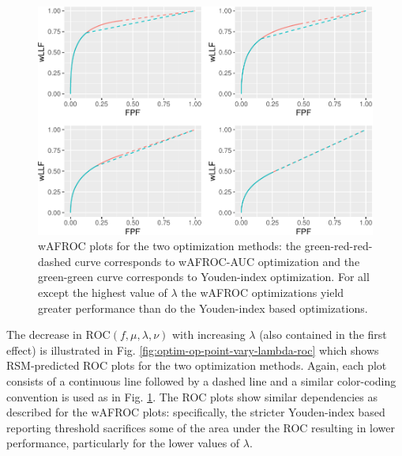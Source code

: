 \documentclass[
]{book}
\begin{document}
\begin{figure}
\centering
\includegraphics{21-optim-op-point_files/figure-latex/optim-op-point-vary-lambda-wafroc-1.pdf}
\caption{\label{fig:optim-op-point-vary-lambda-wafroc}wAFROC plots for the two optimization methods: the green-red-red-dashed curve corresponds to wAFROC-AUC optimization and the green-green curve corresponds to Youden-index optimization. For all except the highest value of \(\lambda\) the wAFROC optimizations yield greater performance than do the Youden-index based optimizations.}
\end{figure}

The decrease in \(\text{ROC} \left ( f, \mu, \lambda, \nu \right )\) with increasing \(\lambda\) (also contained in the first effect) is illustrated in Fig. \ref{fig:optim-op-point-vary-lambda-roc} which shows RSM-predicted ROC plots for the two optimization methods. Again, each plot consists of a continuous line followed by a dashed line and a similar color-coding convention is used as in Fig. \ref{fig:optim-op-point-vary-lambda-wafroc}. The ROC plots show similar dependencies as described for the wAFROC plots: specifically, the stricter Youden-index based reporting threshold sacrifices some of the area under the ROC resulting in lower performance, particularly for the lower values of \(\lambda\).
\end{document}
